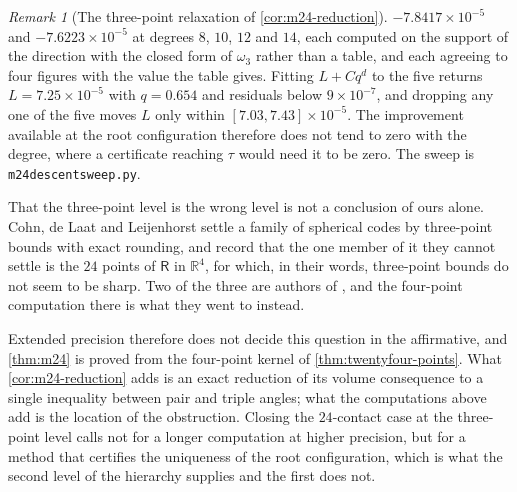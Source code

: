 \documentclass[11pt,reqno]{amsart}
\renewcommand{\_}{\origunderscore\allowbreak}
\numberwithin{equation}{section}
\theoremstyle{plain}
\theoremstyle{definition}
\theoremstyle{remark}
\newtheorem{remark}[thm]{Remark}
\newcommand{\Rt}{\mathsf{R}}                 %
\begin{document}
\begin{remark}[The three-point relaxation of \cref{cor:m24-reduction}]
$-7.8417\times10^{-5}$ and $-7.6223\times10^{-5}$ at degrees $8$,
$10$, $12$ and $14$, each computed on the support of the direction with
the closed form of $\omega_3$ rather than a table, and each agreeing to
four figures with the value the table gives. Fitting $L+Cq^d$ to the
five returns $L=7.25\times10^{-5}$ with $q=0.654$ and residuals below
$9\times10^{-7}$, and dropping any one of the five moves $L$ only
within $[7.03,7.43]\times10^{-5}$. The improvement available at the
root configuration therefore does not tend to zero with the degree,
where a certificate reaching $\tau$ would need it to be zero. The sweep
is \texttt{m24\_descent\_sweep.py}.

That the three-point level is the wrong level is not a conclusion of
ours alone. Cohn, de Laat and Leijenhorst \cite{CdLL24} settle a family
of spherical codes by three-point bounds with exact rounding, and record
that the one member of it they cannot settle is the $24$ points of
$\Rt$ in $\mathbb{R}^4$, for which, in their words, three-point bounds
do not seem to be sharp. Two of the three are authors of \cite{LLM24},
and the four-point computation there is what they went to instead.

Extended precision therefore does not decide this question in the
affirmative, and \cref{thm:m24} is proved from the four-point kernel
of \cref{thm:twentyfour-points}. What \cref{cor:m24-reduction} adds is an
exact reduction of its volume consequence to a single inequality
between pair and triple angles; what the computations above add is the
location of the obstruction. Closing the $24$-contact case at the
three-point level calls not for a longer computation at higher
precision, but for a method that certifies the uniqueness of the root
configuration, which is what the second level of the hierarchy
supplies and the first does not.
\end{remark}
\end{document}
